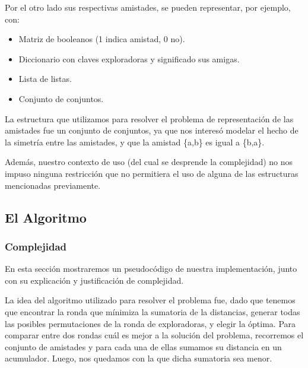 \documentclass[11pt]{article}
\begin{document}
Por el otro lado sus respectivas amistades, se pueden representar, por ejemplo, con:
\begin{itemize}
\item Matriz de booleanos (1 indica amistad, 0 no).
\item Diccionario con claves exploradoras y significado sus amigas.
\item Lista de listas.
\item Conjunto de conjuntos.
\end{itemize}
La estructura que utilizamos para resolver el problema de representación de las amistades fue un conjunto de
conjuntos, ya que nos interesó modelar el hecho de la simetría entre las amistades, y que la amistad 
\{a,b\} es igual a \{b,a\}.

Además, nuestro contexto de uso (del cual se desprende la complejidad) no 
nos impuso ninguna restricción que no permitiera el uso de alguna de las estructuras mencionadas previamente.

\subsection{El Algoritmo}

\subsubsection{Complejidad}

En esta sección mostraremos un pseudocódigo de nuestra implementación, junto con su explicación y justificación
de complejidad.

La idea del algoritmo utilizado para resolver el problema fue, dado que tenemos que encontrar la ronda 
que mínimiza la sumatoria de la distancias, generar todas las posibles permutaciones de la ronda de exploradoras,
y elegir la óptima. Para comparar entre dos rondas cuál es mejor a la solución del problema, 
recorremos el conjunto de amistades y para cada una de ellas sumamos su distancia en un acumulador. Luego, nos quedamos
con la que dicha sumatoria sea menor.
\end{document}

